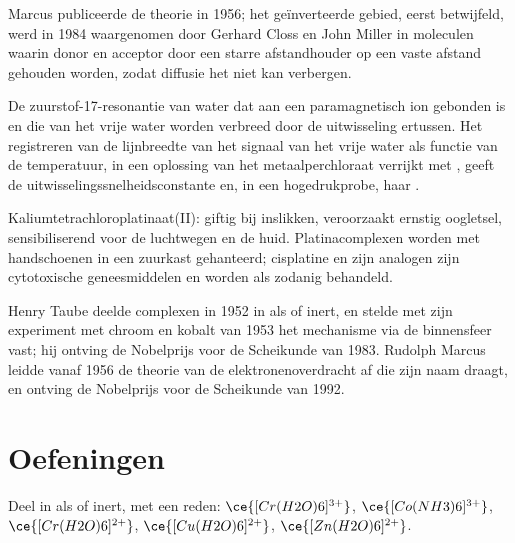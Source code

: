 Marcus publiceerde de theorie in 1956; het geïnverteerde gebied, eerst
betwijfeld, werd in 1984 waargenomen door Gerhard Closs en John Miller in
moleculen waarin donor en acceptor door een starre afstandhouder op een
vaste afstand gehouden worden, zodat diffusie het niet kan verbergen.

\begin{inthelab}
De zuurstof-17-resonantie van water dat aan een paramagnetisch ion
gebonden is en die van het vrije water worden verbreed door de
uitwisseling ertussen. Het registreren van de lijnbreedte van het signaal
van het vrije water als functie van de temperatuur, in een oplossing van
het metaalperchloraat
verrijkt met , geeft de uitwisselingssnelheidsconstante en, in een
hogedrukprobe, haar .
\end{inthelab}

\begin{safety}{}
Kaliumtetrachloroplatinaat(II): giftig bij inslikken, veroorzaakt ernstig
oogletsel, sensibiliserend voor de luchtwegen en de huid.
Platinacomplexen worden met handschoenen in een zuurkast gehanteerd;
cisplatine en zijn analogen zijn cytotoxische geneesmiddelen en worden
als zodanig behandeld.
\end{safety}

\begin{history}
Henry Taube deelde complexen in 1952 in als  of inert, en stelde
met zijn experiment met chroom en kobalt van 1953 het mechanisme via de
binnensfeer vast; hij ontving de Nobelprijs voor de Scheikunde van 1983.
Rudolph Marcus leidde vanaf 1956 de theorie van de elektronenoverdracht
af die zijn naam draagt, en ontving de Nobelprijs voor de Scheikunde van
1992.
\end{history}

\section{Oefeningen}

\begin{exercise}[$\star$]\label{exo:b3:complex-mechanisms:1}
Deel in als  of inert, met een reden: $\ce{[Cr(H2O)6]^{3+}}$, $\ce{[Co(NH3)6]^{3+}}$, $\ce{[Cr(H2O)6]^{2+}}$,
$\ce{[Cu(H2O)6]^{2+}}$, $\ce{[Zn(H2O)6]^{2+}}$.
\end{exercise}

